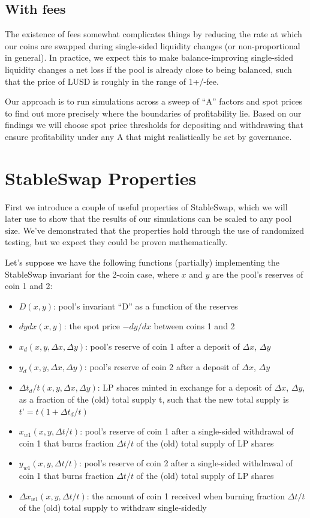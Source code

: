 \documentclass{article}
\begin{document}
\subsection{With fees}

The existence of fees somewhat complicates things by reducing the rate at which our coins are swapped during single-sided liquidity changes (or non-proportional in general). In practice, we expect this to make balance-improving single-sided liquidity changes a net loss if the pool is already close to being balanced, such that the price of LUSD is roughly in the range of 1+/-fee.

Our approach is to run simulations across a sweep of “A” factors and spot prices to find out more precisely where the boundaries of profitability lie. Based on our findings we will choose spot price thresholds for depositing and withdrawing that ensure profitability under any A that might realistically be set by governance.

\section{StableSwap Properties}

First we introduce a couple of useful properties of StableSwap, which we will later use to show that the results of our simulations can be scaled to any pool size. We’ve demonstrated that the properties hold through the use of randomized testing, but we expect they could be proven mathematically.

Let’s suppose we have the following functions (partially) implementing the StableSwap invariant for the 2-coin case, where $x$ and $y$ are the pool’s reserves of coin 1 and 2:

\begin{itemize}
\item $D(x, y)$: pool’s invariant “D” as a function of the reserves
\item $dydx(x, y)$: the spot price $-dy/dx$ between coins 1 and 2
\item $x_d(x, y, \Delta{x}, \Delta{y})$: pool’s reserve of coin 1 after a deposit of $\Delta{x}$, $\Delta{y}$
\item $y_d(x, y, \Delta{x}, \Delta{y})$: pool’s reserve of coin 2 after a deposit of $\Delta{x}$, $\Delta{y}$
\item $\Delta{t}_d/t(x, y, \Delta{x}, \Delta{y})$: LP shares minted in exchange for a deposit of $\Delta{x}$, $\Delta{y}$, as a fraction of the (old) total supply t, such that the new total supply is $t’ = t(1 + \Delta{t}_d/t)$
\item $x_{w1}(x, y, \Delta{t}/t)$: pool’s reserve of coin 1 after a single-sided withdrawal of coin 1 that burns fraction $\Delta{t}/t$ of the (old) total supply of LP shares
\item $y_{w1}(x, y, \Delta{t}/t)$: pool’s reserve of coin 2 after a single-sided withdrawal of coin 1 that burns fraction $\Delta{t}/t$ of the (old) total supply of LP shares
\item $\Delta{x}_{w1}(x, y, \Delta{t}/t)$: the amount of coin 1 received when burning fraction $\Delta{t}/t$ of the (old) total supply to withdraw single-sidedly
\end{itemize}
\end{document}
